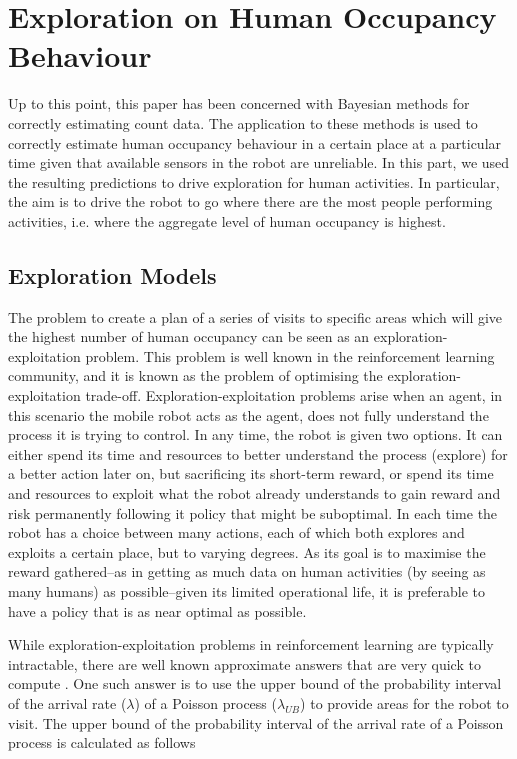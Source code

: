 \section{Exploration on Human Occupancy Behaviour}
\label{sec:exploration}

Up to this point, this paper has been concerned with Bayesian methods for correctly estimating count data. The application to these methods is used to correctly estimate human occupancy behaviour in a certain place at a particular time given that available sensors in the robot are unreliable. In this part, we used the resulting predictions to drive exploration for human activities. In particular, the aim is to drive the robot to go where there are the most people performing activities, i.e. where the aggregate level of human occupancy is highest. 

\subsection*{Exploration Models}

The problem to create a plan of a series of visits to specific areas which will give the highest number of human occupancy can be seen as an exploration-exploitation problem. This problem is well known in the reinforcement learning community, and it is known as the problem of optimising the exploration-exploitation trade-off. Exploration-exploitation problems arise when an agent, in this scenario the mobile robot acts as the agent, does not fully understand the process it is trying to control. In any time, the robot is given two options. It can either spend its time and resources to better understand the process (explore) for a
better action later on, but sacrificing its short-term reward, or spend its time and resources to exploit what the robot already understands to gain reward and risk permanently following it policy that might be suboptimal. In each time the robot has a choice between many actions, each of which both explores and exploits a certain place, but to varying degrees. As its goal is to maximise the reward gathered–as in getting as much data on human activities (by seeing as many humans) as possible–given its limited operational life, it is preferable to have a policy that is as near optimal as possible.

While exploration-exploitation problems in reinforcement learning are typically intractable, there are well known approximate answers that are very quick to compute \cite{wyatt1998exploration, 1413255, AUDIBERT20091876}. One such answer is to use the upper bound of the probability interval of the arrival rate ($\lambda$) of a Poisson process ($\lambda_{UB}$) to provide areas for the robot to visit. The upper bound of the probability interval of the arrival rate of a Poisson process is calculated as follows

